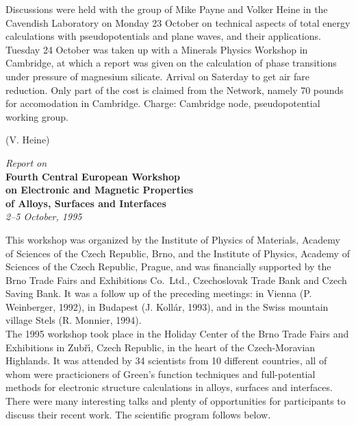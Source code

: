 {\noindent
Discussions were held with the group of Mike Payne and Volker Heine in the
Cavendish Laboratory on Monday 23 October on technical aspects of total energy 
calculations with pseudopotentials and plane waves, and their applications.  
Tuesday 24 October was taken up with a Minerals Physics
Workshop in Cambridge, at which a report was given on the
calculation of phase transitions under pressure of magnesium
silicate. Arrival on Saterday to get air fare reduction.
Only part of the cost is claimed from the Network, namely
70 pounds for accomodation in Cambridge. Charge: Cambridge node,
pseudopotential working group.\\


\begin{flushright}
(V. Heine)
\end{flushright}

\newpage
\null

\begin{center}

\LARGE{\it Report on}\\

\LARGE{\bf Fourth Central European Workshop}\\
\LARGE{\bf on Electronic and Magnetic Properties}\\
\LARGE{\bf of Alloys, Surfaces and Interfaces}\\
{\it 2--5 October, 1995}\\
\end{center}

\vskip3mm
This workshop was organized by the Institute of Physics of Materials, Academy of Sciences
of the Czech Republic, Brno, and the Institute of Physics, Academy of
Sciences of the Czech Republic, Prague, and was financially supported by the Brno Trade 
Fairs and Exhibitions Co.~Ltd., Czechoslovak Trade Bank and Czech Saving Bank. It was a follow 
up of the preceding meetings: in Vienna (P. Weinberger, 1992), in Budapest (J. Koll\'ar, 1993), 
and in the Swiss mountain village Stels (R. Monnier, 1994).  \\

The 1995 workshop took place in the Holiday Center of the Brno Trade Fairs and Exhibitions in
Zub\v{r}\'{\i}, Czech Republic, in the heart of the Czech-Moravian Highlands. It was attended
by 34 scientists from 10 different countries, all of whom were practicioners of Green's function 
techniques and full-potential methods for electronic structure calculations in alloys, surfaces 
and interfaces. There were many interesting talks and plenty of opportunities for participants
to discuss their recent work. The scientific program follows below.\\

}
